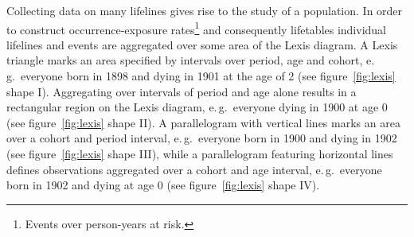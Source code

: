 \documentclass[parskip=half]{scrartcl}
\begin{document}
Collecting data on many lifelines gives rise to the study of a population. In order to construct occurrence-exposure rates\footnote{
Events over person-years at risk.
}
and consequently lifetables individual lifelines and events are aggregated over some area of the Lexis diagram. A Lexis triangle marks an area specified by intervals over period, age and cohort, e.\,g.~everyone born in 1898 and dying in 1901 at the age of 2 (see figure~\ref{fig:lexis} shape I). Aggregating over intervals of period and age alone results in a rectangular region on the Lexis diagram, e.\,g.~everyone dying in 1900 at age 0 (see figure~\ref{fig:lexis} shape II). A parallelogram with vertical lines marks an area over a cohort and period interval, e.\,g.~everyone born in 1900 and dying in 1902 (see figure~\ref{fig:lexis} shape III), while a parallelogram featuring horizontal lines defines observations aggregated over a cohort and age interval, e.\,g.~everyone born in 1902 and dying at age 0 (see figure~\ref{fig:lexis} shape IV).
\end{document}
